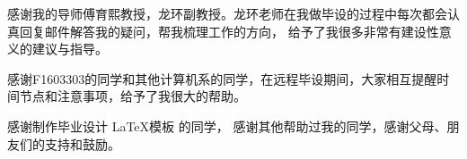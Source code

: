 
\begin{acknowledgements}
  感谢我的导师傅育熙教授，龙环副教授。龙环老师在我做毕设的过程中每次都会认真回复邮件解答我的疑问，帮我梳理工作的方向，
  给予了我很多非常有建设性意义的建议与指导。%

  感谢F1603303的同学和其他计算机系的同学，在远程毕设期间，大家相互提醒时间节点和注意事项，给予了我很大的帮助。

  感谢制作毕业设计 \LaTeX 模板 \href{https://github.com/sjtug/SJTUThesis}{\sjtuthesis} 的同学，
  感谢其他帮助过我的同学，感谢父母、朋友们的支持和鼓励。
\end{acknowledgements}

